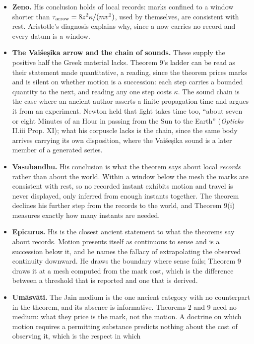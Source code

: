 \documentclass[11pt,a4paper]{article}
\newcommand{\tightlist}{\setlength{\itemsep}{0pt}\setlength{\parskip}{0pt}}
\begin{document}
\begin{itemize}
\tightlist
\item
  \textbf{Zeno.} His conclusion holds of local records: marks confined
  to a window shorter than \(\tau_{\rm arrow}=8z^2\kappa/(mv^2)\), used
  by themselves, are consistent with rest. Aristotle's diagnosis
  explains why, since a now carries no record and every datum is a
  window.
\item
  \textbf{The Vaiśeṣika arrow and the chain of sounds.} These supply the
  positive half the Greek material lacks. Theorem 9's ladder can be read
  as their statement made quantitative, a reading, since the theorem
  prices marks and is silent on whether motion is a succession: each
  step carries a bounded quantity to the next, and reading any one step
  costs \(\kappa\). The sound chain is the case where an ancient author
  asserts a finite propagation time and argues it from an experiment.
  Newton held that light takes time too, ``about seven or eight Minutes
  of an Hour in passing from the Sun to the Earth'' (\emph{Opticks}
  II.iii Prop. XI); what his corpuscle lacks is the chain, since the
  same body arrives carrying its own disposition, where the Vaiśeṣika
  sound is a later member of a generated series.
\item
  \textbf{Vasubandhu.} His conclusion is what the theorem says about
  local \emph{records} rather than about the world. Within a window
  below the mesh the marks are consistent with rest, so no recorded
  instant exhibits motion and travel is never displayed, only inferred
  from enough instants together. The theorem declines his further step
  from the records to the world, and Theorem 9(i) measures exactly how
  many instants are needed.
\item
  \textbf{Epicurus.} His is the closest ancient statement to what the
  theorems say about records. Motion presents itself as continuous to
  sense and is a succession below it, and he names the fallacy of
  extrapolating the observed continuity downward. He draws the boundary
  where sense fails; Theorem 9 draws it at a mesh computed from the mark
  cost, which is the difference between a threshold that is reported and
  one that is derived.
\item
  \textbf{Umāsvāti.} The Jain medium is the one ancient category with no
  counterpart in the theorem, and its absence is informative. Theorems 2
  and 9 need no medium: what they price is the mark, not the motion. A
  doctrine on which motion requires a permitting substance predicts
  nothing about the cost of observing it, which is the respect in which

\end{itemize}
\end{document}
